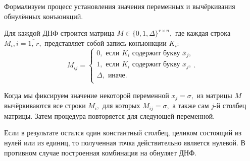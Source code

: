 \documentclass[12pt,a4paper,oneside,fleqn,leqno]{article}
\theoremstyle{definition}
\begin{document}
		Формализуем процесс установления значения переменных и вычёркивания обнулённых конъюнкций.\par
		Для каждой ДНФ строится матрица $M \in \{0, 1, \Delta\}^{r \times n},$ где каждая строка $M_i, i=\overline{1,\,r},$ представляет собой запись конъюнкции $K_i$:
			$$
				M_{ij} = \begin{cases}
					0,\text{ если $K_i$ содержит букву $\bar{x}_j$,}\\
					1,\text{ если $K_i$ содержит букву $x_j$,}\\
					\Delta,\text{ иначе.}\\
				\end{cases}.
			$$\par
			Когда мы фиксируем значение некоторой переменной $x_j = \sigma,$ из матрицы $M$ вычёркиваются все строки $M_i,$ для которых $M_{ij} = \sigma,$ а также сам $j$-й столбец матрицы. Затем процедура повторяется для следующей переменной.\par
			Если в результате остался один константный столбец, целиком состоящий из нулей или из единиц, то полученная точка действительно является нулевой. В противном случае построенная комбинация на обнуляет ДНФ.\par
\end{document}
